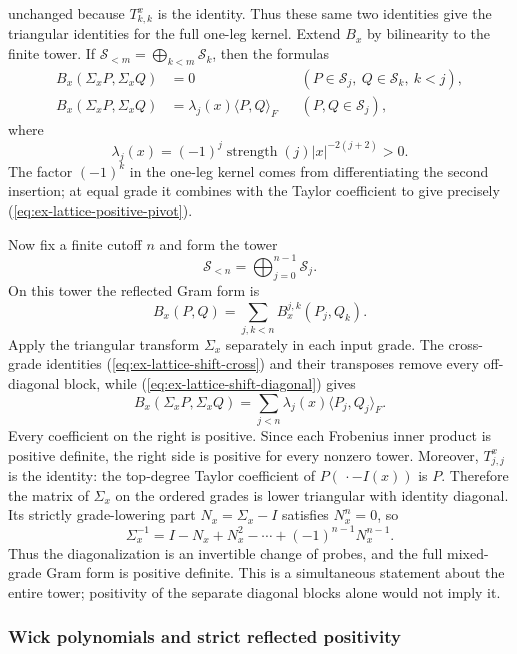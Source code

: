 unchanged because $T_{k,k}^x$ is the identity. Thus these same two
identities give the triangular identities for the full one-leg kernel.
Extend $B_x$ by bilinearity to the finite tower. If
$\mathscr S_{<m}=\bigoplus_{k<m}\mathscr S_k$, then the formulas
\begin{align}
 B_x(\Sigma_xP,\Sigma_xQ)&=0
     &&(P\in\mathscr S_j,\ Q\in\mathscr S_k,\ k<j),
       \label{eq:ex-lattice-shift-cross}\\
 B_x(\Sigma_xP,\Sigma_xQ)&=\lambda_j(x)
     \langle P,Q\rangle_F
     &&(P,Q\in\mathscr S_j),
       \label{eq:ex-lattice-shift-diagonal}
\end{align}
where
\begin{equation}\label{eq:ex-lattice-positive-pivot}
 \lambda_j(x)=(-1)^j\operatorname{strength}(j)|x|^{-2(j+2)}>0.
\end{equation}
The factor $(-1)^k$ in the one-leg kernel comes from differentiating the
second insertion; at equal grade it combines with the Taylor coefficient
to give precisely (\ref{eq:ex-lattice-positive-pivot}).

Now fix a finite cutoff $n$ and form the tower
\[
 \mathscr S_{<n}=\bigoplus_{j=0}^{n-1}\mathscr S_j.
\]
On this tower the reflected Gram form is
\[
 B_x(P,Q)=\sum_{j,k<n}B_x^{j,k}(P_j,Q_k).
\]
Apply the triangular transform $\Sigma_x$ separately in each input grade.
The cross-grade identities (\ref{eq:ex-lattice-shift-cross}) and their
transposes remove every off-diagonal block, while
(\ref{eq:ex-lattice-shift-diagonal}) gives
\begin{equation}\label{eq:ex-lattice-tower-gram}
 B_x(\Sigma_xP,\Sigma_xQ)
 =\sum_{j<n}\lambda_j(x)\langle P_j,Q_j\rangle_F.
\end{equation}
Every coefficient on the right is positive. Since each Frobenius inner
product is positive definite, the right side is positive for every nonzero
tower. Moreover, $T_{j,j}^{x}$ is the identity: the top-degree Taylor
coefficient of $P(\,\cdot-I(x))$ is $P$. Therefore the matrix of $\Sigma_x$
on the ordered grades is lower triangular with identity diagonal. Its
strictly grade-lowering part $N_x=\Sigma_x-I$ satisfies $N_x^n=0$, so
\[
 \Sigma_x^{-1}=I-N_x+N_x^2-\cdots+(-1)^{n-1}N_x^{n-1}.
\]
Thus the diagonalization is an invertible change of probes, and the full
mixed-grade Gram form is positive definite. This is a
simultaneous statement about the entire tower; positivity of the separate
diagonal blocks alone would not imply it.

\subsubsection{Wick polynomials and strict reflected positivity}

